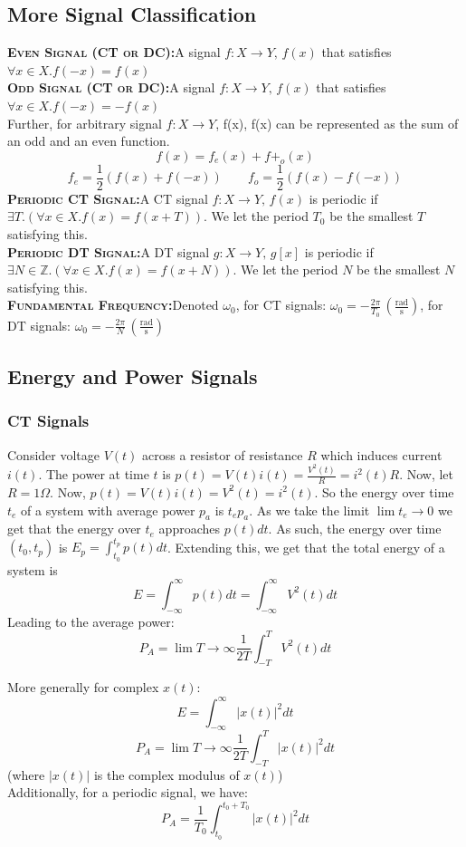 \documentclass[a4paper,12pt]{article}
\newcommand{\define}[2]{\label{#1}\textbf{\textsc{#1:}}\quad#2\\}
\begin{document}
\subsection{More Signal Classification}
\define{Even Signal (CT or DC)}{A signal $f:X\rightarrow Y,\, f(x)$ that satisfies $\forall x\in X. f(-x) = f(x)$}
\define{Odd Signal (CT or DC)}{A signal $f:X\rightarrow Y,\, f(x)$ that satisfies $\forall x\in X. f(-x) = -f(x)$}
Further, for arbitrary signal $f:X\rightarrow Y$, f(x), f(x) can be represented as the sum of an odd and an even function.
\[
	f(x)=f_e(x)+f+_o(x)
\]
\[
	f_e=\frac{1}{2}(f(x)+f(-x))
	\qquad{}
	f_o=\frac{1}{2}(f(x)-f(-x))
\]
\define{Periodic CT Signal}{A CT signal $f:X\rightarrow Y,\, f(x)$ is periodic if $\exists T. (\forall x\in X. f(x)=f(x+T))$. We let the period $T_0$ be the smallest $T$ satisfying this.}
\define{Periodic DT Signal}{A DT signal $g:X\rightarrow Y,\, g[x]$ is periodic if $\exists N\in \mathbb{Z}. (\forall x\in X. f(x)=f(x+N))$. We let the period $N$ be the smallest $N$ satisfying this.}
\define{Fundamental Frequency}{Denoted $\omega _0$, for CT signals: $\omega _0=-\frac{2\pi}{T_0}\,(\frac{\textrm{rad}}{\textrm{s}})$, for DT signals: $\omega _0=-\frac{2\pi}{N}\,(\frac{\textrm{rad}}{\textrm{s}})$}
\subsection{Energy and Power Signals}
\subsubsection{CT Signals}
Consider voltage $V(t)$ across a resistor of resistance $R$ which induces current $i(t)$.
The power at time $t$ is $p(t)=V(t)i(t)=\frac{V^2(t)}{R}=i^2(t)R$. Now, let $R=1\Omega$. Now, $p(t)=V(t)i(t)=V^2(t)=i^2(t)$.
So the energy over time $t_e$ of a system with average power $p_a$ is $t_ep_a$. As we take the limit $\lim{t_e\to0}$ we get that the energy over $t_e$ approaches $p(t)dt$. As such, the energy over time $(t_0, t_p)$ is $E_p=\int_{t_0}^{t_p} p(t)dt$. Extending this, we get that the total energy of a system is
$$E = \int_{-\infty}^{\infty} p(t)dt = \int_{-\infty}^{\infty} V^2(t) dt $$
Leading to the average power:
$$P_A = \lim{T\to\infty} \frac{1}{2T}\int_{-T}^{T} V^2(t) dt$$

More generally for complex $x(t)$:
$$E = \int_{-\infty}^{\infty} |x(t)|^2 dt$$
$$P_A = \lim{T\to\infty} \frac{1}{2T}\int_{-T}^{T} |x(t)|^2 dt$$
(where $|x(t)|$ is the complex modulus of $x(t)$)\\
Additionally, for a periodic signal, we have:
$$P_A = \frac{1}{T_0}\int_{t_0}^{t_0+T_0} |x(t)|^2 dt$$
\end{document}
